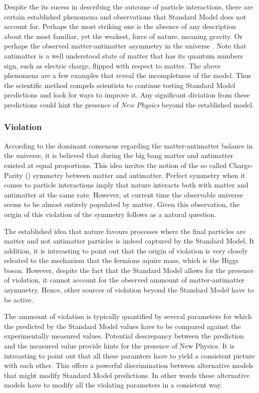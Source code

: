 Despite the its sucess in describing the outcome of particle interactions, there are certain
established phenomena and observations that Standard Model does not account for.
Perhaps the most striking one is the absence of any description about the most familiar,
yet the weakest, force of nature, meaning gravity. Or perhaps the observed matter-antimatter
asymmetry in the universe \cite{more-cpv-huet,more-cpv-gavela_I,more-cpv-gavela_II}.
Note that antimatter is a well understood state of matter that has its quantum numbers sign,
such as electric charge, flipped with respect to matter. The above phenomena are a few
examples that reveal the incompletness of the model. Thus the scientific method compels
scientists to continue testing Standard Model predictions and look for ways to improve it.
Any significant diviation from these predictions could hint the presence of
{\it New Physics} beyond the established model.

\subsubsection{\CP Violation}
According to the dominant consensus regarding the matter-antimatter balance in the
universe, it is believed that during the big bang matter and antimatter existed at
equal proportions. This idea invites the notion of the so called Charge-Parity (\CP)
symmetry between matter and antimatter. Perfect \CP symmetry when it comes to particle
interactions imply that nature interacts both with matter and antimatter at the same rate.
However, at current time the observable universe seems to be almost entirely populated by
matter. Given this observation, the origin of this violation of the \CP symmetry follows
as a natural question.

The established idea that nature favours processes where the final particles are matter
and not antimatter particles is indeed captured by the Standard Model. It addition, it
is intreasting to point out that the origin of \CP violation is very closely releated
to the mechanism that the fermions aquire mass, which is the Higgs boson. However,
despite the fact that the Standard Model allows for the presence of \CP violation,
it cannot account for the observed ammount of matter-antimatter asymmetry.
Hence, other sources of \CP violation beyond the Standard Model have to be active.

The ammount of \CP violation is typically quantified by several parameters for which
the predicted by the Standard Model values have to be compared against the experimentally
measured values. Potential descrepancy between the prediction and the measured value
provide hints for the presence of New Physics. It is intreasting to point out that all these paramters have to yield
a consistent picture with each other. This offers a powerful discrimination between alternative models that might
modify Standard Model predictions. In other words these alternative models have to
modify all the \CP violating parameters in a consistent way.



